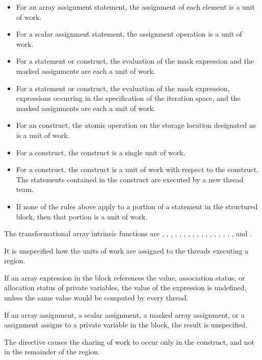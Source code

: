 \begin{fortranspecific}
\begin{itemize}
\item For an array assignment statement, the assignment of each element is 
      a unit of work.
\item For a scalar assignment statement, the assignment operation is a unit of work.
\item For a  statement or construct, the evaluation of the mask 
      expression and the masked assignments are each a unit of work.
\item For a  statement or construct, the evaluation of the mask 
      expression, expressions occurring in the specification of the iteration 
      space, and the masked assignments are each a unit of work.
\item For an  construct, the atomic operation on the storage 
      location designated as  is a unit of work.
\item For a  construct, the construct is a single unit of work.
\item For a  construct, the construct is a unit of work with 
      respect to the  construct. The statements contained in 
      the  construct are executed by a new thread team.
\item If none of the rules above apply to a portion of a statement in the 
      structured block, then that portion is a unit of work.
\end{itemize}

The transformational array intrinsic functions are , ,
, , , , ,
, , , , ,
, , , , 
, and .

It is unspecified how the units of work are assigned to the threads executing a
 region.

If an array expression in the block references the value, association status, or 
allocation status of private variables, the value of the expression is undefined, 
unless the same value would be computed by every thread.

If an array assignment, a scalar assignment, a masked array assignment, or a 
 assignment assigns to a private variable in the block, the result 
is unspecified.

The  directive causes the sharing of work to occur only in the 
 construct, and not in the remainder of the  region.


\end{fortranspecific}
